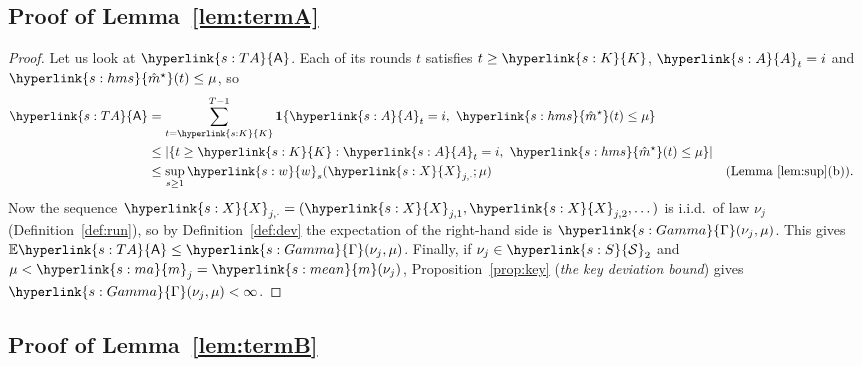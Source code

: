 \documentclass[11pt]{article}
\newcommand{\E}{\mathbb{E}}
\newcommand{\ind}{\mathbf{1}}
\newcommand{\sy}[2]{{\hyperlink{#1}{#2}}}
\newcommand{\Sm}{\sy{s:S}{\mathcal{S}}}
\newcommand{\mean}{\sy{s:mean}{m}}
\newcommand{\Karms}{\sy{s:K}{K}}
\newcommand{\marm}{\sy{s:ma}{m}}
\newcommand{\Xs}{\sy{s:X}{X}}
\newcommand{\Ap}{\sy{s:A}{A}}
\newcommand{\hms}{\sy{s:hms}{\hat{m}^{\star}}}
\newcommand{\ws}{\sy{s:w}{w}}
\newcommand{\Gam}{\sy{s:Gamma}{\Gamma}}
\newcommand{\TA}{\sy{s:TA}{\mathsf{A}}}
\begin{document}
\subsection{Proof of Lemma~\ref{lem:termA}}\label{sec:proof-lem-termA}

\begin{proof}
Let us look at $\TA$. Each of its rounds $t$ satisfies $t\ge \Karms$, $\Ap_t=i$ and $\hms(t)\le\mu$, so
\begin{align*}
  \TA&=\sum_{t=\Karms}^{T-1}\ind\{\Ap_t=i,\ \hms(t)\le\mu\}\\
  &\le|\{t\ge \Karms:\Ap_t=i,\ \hms(t)\le\mu\}|\\
  &\le\sup_{s\ge1}\ws_s(\Xs_{j,\cdot};\mu)&&\text{(Lemma~\ref{lem:sup}(b))}.
\end{align*}
Now the sequence $\Xs_{j,\cdot}=(\Xs_{j,1},\Xs_{j,2},\dots)$ is i.i.d.\ of law $\nu_j$
(Definition~\ref{def:run}), so by Definition~\ref{def:dev} the expectation of the right-hand side is
$\Gam(\nu_j,\mu)$. This gives $\E\TA\le\Gam(\nu_j,\mu)$. Finally, if $\nu_j\in\Sm_2$ and
$\mu<\marm_j=\mean(\nu_j)$, Proposition~\ref{prop:key} (\emph{the key deviation bound}) gives
$\Gam(\nu_j,\mu)<\infty$.
\end{proof}

\subsection{Proof of Lemma~\ref{lem:termB}}\label{sec:proof-lem-termB}
\end{document}
